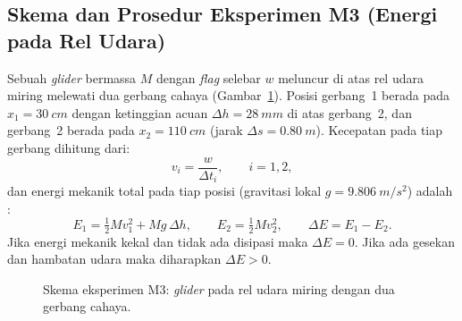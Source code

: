 \documentclass[a4paper, 12pt]{article}
\begin{document}
        \subsection{Skema dan Prosedur Eksperimen M3 (Energi pada Rel Udara)}
        Sebuah \textit{glider} bermassa $M$ dengan \textit{flag} selebar $w$ meluncur di atas rel udara miring melewati dua gerbang cahaya (Gambar~\ref{fig:skema}). Posisi gerbang~1 berada pada $x_1=\SI{30}{cm}$ dengan ketinggian acuan $\Delta h=\SI{28}{mm}$ di atas gerbang~2, dan gerbang~2 berada pada $x_2=\SI{110}{cm}$ (jarak $\Delta s=\SI{0,80}{m}$). Kecepatan pada tiap gerbang dihitung dari:
        \begin{equation}
            v_i=\frac{w}{\Delta t_i},\qquad i=1,2,
            \label{eq:v}
        \end{equation}
        dan energi mekanik total pada tiap posisi (gravitasi lokal $g=\SI{9,806}{m/s^2}$) adalah \parencite{HallidayResnickWalker}:
        \begin{equation}
            E_1=\tfrac{1}{2}Mv_1^{2}+Mg\,\Delta h,\qquad
            E_2=\tfrac{1}{2}Mv_2^{2},\qquad
            \Delta E=E_1-E_2.
            \label{eq:E}
        \end{equation}
        Jika energi mekanik kekal dan tidak ada disipasi maka $\Delta E=0$. Jika ada gesekan dan hambatan udara maka diharapkan $\Delta E>0$.
\begin{figure}[H]
\centering
{}
\caption{Skema eksperimen M3: \textit{glider} pada rel udara miring dengan dua gerbang cahaya.}
\label{fig:skema}
\end{figure}
\end{document}
